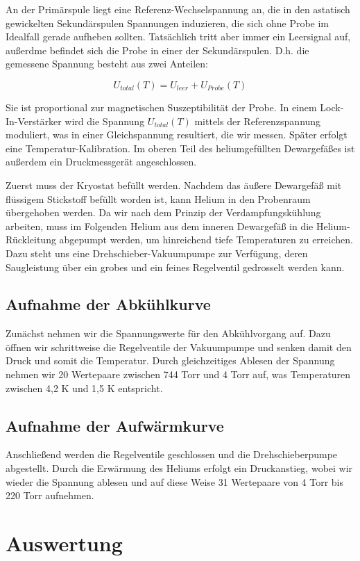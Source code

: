 \documentclass[bigchapter,colorback,accentcolor=tud4b,linedtoc,11pt]{tudreport}
\begin{document}
An der Primärspule liegt eine Referenz-Wechselspannung an, die in den astatisch gewickelten Sekundärspulen Spannungen induzieren, die sich ohne Probe im Idealfall gerade aufheben sollten. Tatsächlich tritt aber immer ein Leersignal auf, außerdme befindet sich die Probe in einer der Sekundärspulen. D.h. die gemessene Spannung besteht aus zwei Anteilen: 

$$U_{total}(T) = U_{leer} + U_{Probe}(T)$$

Sie ist proportional zur magnetischen Suszeptibilität der Probe. In einem Lock-In-Verstärker wird die Spannung $U_{total}(T)$ mittels der Referenzspannung moduliert, was in einer Gleichspannung resultiert, die wir messen. Später erfolgt eine Temperatur-Kalibration. Im oberen Teil des heliumgefüllten Dewargefäßes ist außerdem ein Druckmessgerät angeschlossen.

Zuerst muss der Kryostat befüllt werden. Nachdem das äußere Dewargefäß mit flüssigem Stickstoff befüllt worden ist, kann Helium in den Probenraum übergehoben werden. Da wir nach dem Prinzip der Verdampfungskühlung arbeiten, muss im Folgenden Helium aus dem inneren Dewargefäß in die Helium-Rückleitung abgepumpt werden, um hinreichend tiefe Temperaturen zu erreichen. Dazu steht uns eine Drehschieber-Vakuumpumpe zur Verfügung, deren Saugleistung über ein grobes und ein feines Regelventil gedrosselt werden kann. 

\section{Aufnahme der Abkühlkurve}

Zunächst nehmen wir die Spannungswerte für den Abkühlvorgang auf. Dazu öffnen wir schrittweise die Regelventile der Vakuumpumpe und senken damit den Druck und somit die Temperatur. Durch gleichzeitiges Ablesen der Spannung nehmen wir 20 Wertepaare zwischen 744 Torr und 4 Torr auf, was Temperaturen zwischen 4,2 K und 1,5 K entspricht.

\section{Aufnahme der Aufwärmkurve}

Anschließend werden die Regelventile geschlossen und die Drehschieberpumpe abgestellt. Durch die Erwärmung des Heliums erfolgt ein Druckanstieg, wobei wir wieder die Spannung ablesen und auf diese Weise 31 Wertepaare von 4 Torr bis 220 Torr aufnehmen.

\chapter{Auswertung}
\end{document}
